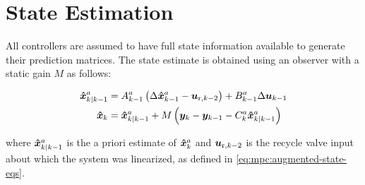 \section{State Estimation}
\label{sec:mpc:estimation}

All controllers are assumed to have full state information available to generate their prediction matrices.
The state estimate is obtained using an observer with a static gain $M$ as follows:

\begin{equation}
  \begin{split}
    \bm{\hat{x}}_{k|k-1}^a & = A_{k-1}^a \left(\Delta \bm{\hat{x}}_{k-1}^a - \bm{u}_{\text{r},k-2}\right) + B_{k-1}^a \Delta \bm{u}_{k-1}\\
    \bm{\hat{x}}_{k} & = \bm{\hat{x}}_{k|k-1}^a + M \left( \bm{y}_k-\bm{y}_{k-1} - C_k^a \bm{\hat{x}}_{k|k-1}^a \right)
  \end{split}
\end{equation}

\noindent where $\bm{\hat{x}}_{k|k-1}^a$ is the a priori estimate of $\bm{\hat{x}}_k^a$ and $\bm{u}_{\text{r},k-2}$ is the recycle valve input about which the system was linearized, as defined in \eqref{eq:mpc:augmented-state-eqs}.

